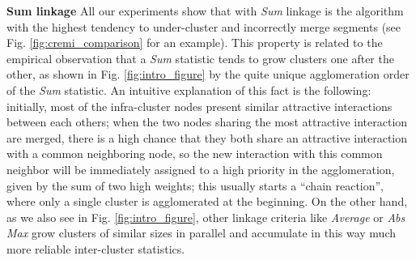 \textbf{Sum linkage } 
All our experiments show that \algname{} with \emph{Sum} linkage is the algorithm with the highest tendency to under-cluster and incorrectly merge segments (see Fig. \ref{fig:cremi_comparison} for an example). This property is related to the empirical observation that a \emph{Sum} statistic tends to grow clusters one after the other, as shown in Fig. \ref{fig:intro_figure} by the quite unique agglomeration order of the \emph{Sum} statistic. An intuitive explanation of this fact is the following: initially, most of the infra-cluster nodes present similar attractive interactions between each others; when the two nodes sharing the most attractive interaction are merged, there is a high chance that they both share an attractive interaction with a common neighboring node, so the new interaction with this common neighbor will be immediately assigned to a high priority in the agglomeration, given by the sum of two high weights; this usually starts a ``chain reaction'', where only a single cluster is agglomerated at the beginning. On the other hand, as we also see in Fig. \ref{fig:intro_figure}, other linkage criteria like \emph{Average} or \emph{Abs Max} grow clusters of similar sizes in parallel and accumulate in this way much more reliable inter-cluster statistics.





